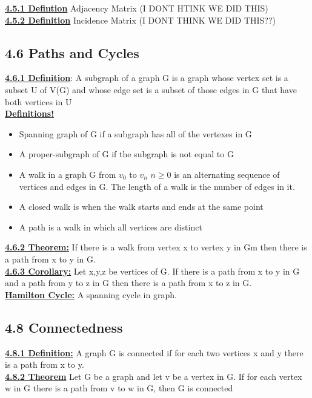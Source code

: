 \documentclass[12pt]{article}
\newcommand{\myt}[1]{\textbf{\underline{#1}}}
\begin{document}
	\myt{4.5.1 Defintion} Adjacency Matrix (I DONT HTINK WE DID THIS)\\
	
	\myt{4.5.2 Definition} Incidence Matrix (I DONT THINK WE DID THIS??)\\
	
	\subsection*{4.6 Paths and Cycles}
	\myt{4.6.1 Definition}: A subgraph of a graph G is a graph whose vertex set is a subset U of V(G) and whose edge set is a subset of those edges in G that have both vertices in U\\
	
	\myt{Definitions!}\\
	\begin{itemize}
		\item Spanning graph of G if a subgraph has all of the vertexes in G
		\item A proper-subgraph of G if the subgraph is not equal to G
		\item A walk in a graph G from $v_0$ to $v_n$ $n \geq 0$ is an alternating sequence of vertices and edges in G. The length of a walk is the number of edges in it.
		\item A closed walk is when the walk starts and ends at the same point
		\item A path is a walk in which all vertices are distinct
	\end{itemize}
	
	\myt{4.6.2 Theorem:} If there is a walk from vertex x to vertex y in Gm then there is a path from x to y in G.\\
	
	\myt{4.6.3 Corollary:} Let x,y,z be vertices of G. If there is a path from x to y in G and a path from y to z in G then there is a path from x to z in G.\\

	\myt{Hamilton Cycle:} A spanning cycle in graph.\\
	
	\subsection*{4.8 Connectedness}
	\myt{4.8.1 Definition:} A graph G is connected if for each two vertices x and y there is a path from x to y.\\
	
	\myt{4.8.2 Theorem} Let G be a graph and let v be a vertex in G. If for each vertex w in G there is a path from v to w in G, then G is connected\\
	
\end{document}
